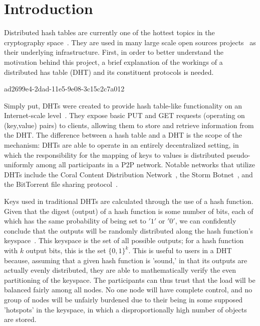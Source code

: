 \documentclass[12pt]{article}
\begin{document}
\section{Introduction}
\par Distributed hash tables are currently one of the hottest topics in the cryptography space~\cite{Stoica:2001dj,Rowstron:2001ea,Ratnasamy:2001wn}. They are used in many large scale open sources projects~\cite{Freitas:2013tb,Xu:2010vs,Perfitt:2010fh} as their underlying infrastructure. First, in order to better understand the motivation behind this project, a brief explanation of the workings of a distributed has table (DHT) and its constituent protocols is needed.

ad2699e4-2dad-11e5-9e08-3c15c2c7a012\par Simply put, DHTs were created to provide hash table-like functionality on an Internet-scale level~\cite{Ratnasamy:2001wn}. They expose basic PUT and GET requests (operating on (key,value) pairs) to clients, allowing them to store and retrieve information from the DHT. The difference between a hash table and a DHT is the scope of the mechanism: DHTs are able to operate in an entirely decentralized setting, in which the responsibility for the mapping of keys to values is distributed pseudo-uniformly among all participants in a P2P network. Notable networks that utilize DHTs include the Coral Content Distribution Network~\cite{Freedman:2004vb}, the Storm Botnet~\cite{Holz:2008uk}, and the BitTorrent file sharing protocol~\cite{Cohen:y1_8mBnw}.

\par Keys used in traditional DHTs are calculated through the use of a hash function. Given that the digest (output) of a hash function is some number of bits, each of which has the same probability of being set to $'1'$ or $'0'$, we can confidently conclude that the outputs will be randomly distributed along the hash function's keyspace~. This keyspace is the set of all possible outputs; for a hash function with $k$ output bits, this is the set $\{0,1\}^k$. This is useful to users in a DHT because, assuming that a given hash function is 'sound,' in that its outputs are actually evenly distributed, they are able to mathematically verify the even partitioning of the keyspace. The participants can thus trust that the load will be balanced fairly among all nodes. No one node will have complete control, and no group of nodes will be unfairly burdened due to their being in some supposed 'hotspots' in the keyspace, in which a disproportionally high number of objects are stored.~
\end{document}
